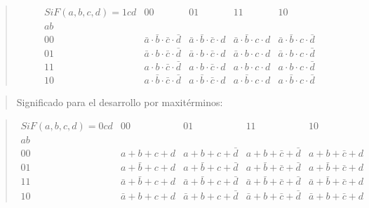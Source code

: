 \begin{quote}
\[\begin{matrix}
{\mathit{Si}F{{({a,b,c,d})} = 1}\mathit{cd}} & 00 & 01 & 11 & 10 \\
\mathit{ab} & & & & \\
00 & {{{\bar{a} \cdot \bar{b}} \cdot \bar{c}} \cdot \bar{d}} & {{{\bar{a} \cdot \bar{b}} \cdot \bar{c}} \cdot d} & {{{\bar{a} \cdot \bar{b}} \cdot c} \cdot d} & {{{\bar{a} \cdot \bar{b}} \cdot c} \cdot \bar{d}} \\
01 & {{{\bar{a} \cdot b} \cdot \bar{c}} \cdot \bar{d}} & {{{\bar{a} \cdot b} \cdot \bar{c}} \cdot d} & {{{\bar{a} \cdot b} \cdot c} \cdot d} & {{{\bar{a} \cdot b} \cdot c} \cdot \bar{d}} \\
11 & {{{a \cdot b} \cdot \bar{c}} \cdot \bar{d}} & {{{a \cdot b} \cdot \bar{c}} \cdot d} & {{{a \cdot b} \cdot c} \cdot d} & {{{a \cdot b} \cdot c} \cdot \bar{d}} \\
10 & {{{a \cdot \bar{b}} \cdot \bar{c}} \cdot \bar{d}} & {{{a \cdot \bar{b}} \cdot \bar{c}} \cdot d} & {{{a \cdot \bar{b}} \cdot c} \cdot d} & {{{a \cdot \bar{b}} \cdot c} \cdot \bar{d}}
\end{matrix}\]
\end{quote}

\begin{quote}
Significado para el desarrollo por maxitérminos:
\end{quote}

\begin{quote}
\[\begin{matrix}
{\mathit{Si}F{{({a,b,c,d})} = 0}\mathit{cd}} & 00 & 01 & 11 & 10 \\
\mathit{ab} & & & & \\
00 & {{{a + b} + c} + d} & {{{a + b} + c} + \bar{d}} & {{{a + b} + \bar{c}} + \bar{d}} & {{{a + b} + \bar{c}} + d} \\
01 & {{{a + \bar{b}} + c} + d} & {{{a + \bar{b}} + c} + \bar{d}} & {{{a + \bar{b}} + \bar{c}} + \bar{d}} & {{{a + \bar{b}} + \bar{c}} + d} \\
11 & {{{\bar{a} + \bar{b}} + c} + d} & {{{\bar{a} + \bar{b}} + c} + \bar{d}} & {{{\bar{a} + \bar{b}} + \bar{c}} + \bar{d}} & {{{\bar{a} + \bar{b}} + \bar{c}} + d} \\
10 & {{{\bar{a} + b} + c} + d} & {{{\bar{a} + b} + c} + \bar{d}} & {{{\bar{a} + b} + \bar{c}} + \bar{d}} & {{{\bar{a} + b} + \bar{c}} + d}
\end{matrix}\]
\end{quote}

